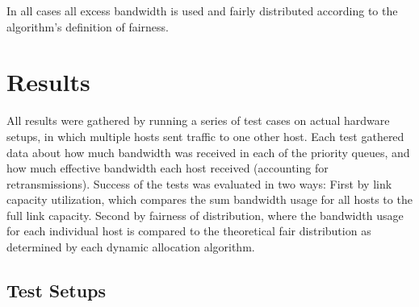 \documentclass[accepted,single]{gipaper}
\begin{document}
In all cases all excess bandwidth is used and fairly distributed according to the algorithm's definition of fairness.

\section{Results}
\label{results}
%

All results were gathered by running a series of test cases on actual hardware setups, in which multiple hosts sent traffic to one other host. Each test gathered data about how much bandwidth was received in each of the priority queues, and how much effective bandwidth each host received (accounting for retransmissions). Success of the tests was evaluated in two ways: First by link capacity utilization, which compares the sum bandwidth usage for all hosts to the full link capacity. Second by fairness of distribution, where the bandwidth usage for each individual host is compared to the theoretical fair distribution as determined by each dynamic allocation algorithm.   

\subsection{Test Setups}
\label{result_setups}
\end{document}
